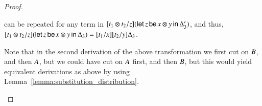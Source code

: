 \documentclass{elsarticle}
\begin{document}
\begin{proof}
\begin{report}
\begin{itemize}
can be repeated for any term in $[   \mathit{t_{{\mathrm{1}}}}  \otimes  \mathit{t_{{\mathrm{2}}}}   /  \mathit{z}  ]  (    \mathsf{let}\, \mathit{z} \,\mathsf{be}\,  \mathit{x}  \otimes  \mathit{y}  \,\mathsf{in}\, \Delta'_{{\mathrm{3}}}    )$, and thus, $[   \mathit{t_{{\mathrm{1}}}}  \otimes  \mathit{t_{{\mathrm{2}}}}   /  \mathit{z}  ]  (    \mathsf{let}\, \mathit{z} \,\mathsf{be}\,  \mathit{x}  \otimes  \mathit{y}  \,\mathsf{in}\, \Delta_{{\mathrm{3}}}    )  =  [  \mathit{t_{{\mathrm{1}}}}  /  \mathit{x}  ]  [  \mathit{t_{{\mathrm{2}}}}  /  \mathit{y}  ]  \Delta_{{\mathrm{3}}}$.

Note that in the second derivation of the above transformation we
first cut on $\mathit{B}$, and then $\mathit{A}$, but we could have cut on
$\mathit{A}$ first, and then $\mathit{B}$, but this would yield equivalent
derivations as above by using
Lemma~\ref{lemma:substitution_distribution}.


\end{itemize}
\end{report}
\end{proof}
\end{document}
